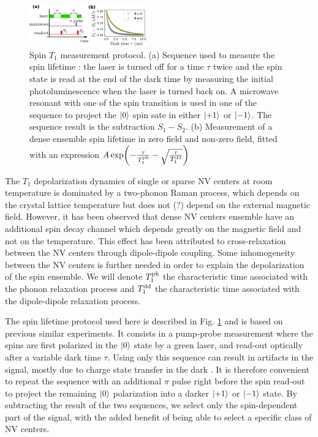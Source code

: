 \documentclass[preprintnumbers,amsmath,amssymb,superscriptaddress,twocolumn,showpacs]{revtex4-2}
\begin{document}
\begin{figure}
\includegraphics[width=0.45\textwidth]{Figures/fig T1}
\caption{Spin $T_1$ measurement protocol. (a) Sequence used to measure the spin lifetime : the laser is turned off for a time $\tau$ twice and the spin state is read at the end of the dark time by measuring the initial photoluminescence when the laser is turned back on. A microwave resonant with one of the spin transition is used in one of the sequence to project the $\ket{0}$ spin sate in either $\ket{+1}$ or $\ket{-1}$. The sequence result is the subtraction $S_1-S_2$. (b) Measurement of a dense ensemble spin lifetime in zero field and non-zero field, fitted with an expression $A \exp (-\frac{\tau}{T_1^{\rm ph}} -\sqrt{\frac{\tau}{T_1^{\rm dd}}})$}
\label{T1}
\end{figure}

The $T_1$ depolarization dynamics of single or sparse NV centers at room temperature is dominated by a two-phonon Raman process, which depends on the crystal lattice temperature but does not (?) depend on the external magnetic field. However, it has been observed that dense NV centers ensemble have an additional spin decay channel which depends greatly on the magnetic field and not on the temperature. This effect has been attributed to cross-relaxation between the NV centers through dipole-dipole coupling. Some inhomogeneity between the NV centers is further needed in order to explain the depolarization of the spin ensemble. We will denote $T_1^{\rm ph}$ the characteristic time associated with the phonon relaxation process and $T_1^{\rm dd}$ the characteristic time associated with the dipole-dipole relaxation process.

The spin lifetime protocol used here is described in Fig. \ref{T1} and is based on previous similar experiments. It consists in a pump-probe measurement where the spins are first polarized in the $\ket{0}$ state by a green laser, and read-out optically after a variable dark time $\tau$. Using only this sequence can result in artifacts in the signal, mostly due to charge state transfer in the dark \citep{giri_coupled_2018}. It is therefore convenient to repeat the sequence with an additional $\pi$ pulse right before the spin read-out to project the remaining $\ket{0}$ polarization into a darker $\ket{+1}$ or $\ket{-1}$ state. By subtracting the result of the two sequences, we select only the spin-dependent part of the signal, with the added benefit of being able to select a specific class of NV centers. 
\end{document}

